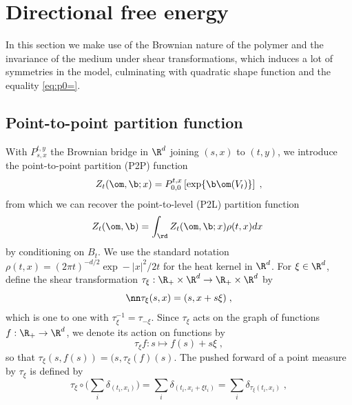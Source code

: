  \chapter{Directional free energy} \label{ch:dir}
 
 In this section we make use of the Brownian nature of the polymer and the invariance of the medium under shear transformations, which induces a lot of symmetries in the model, culminating with quadratic shape function and the equality
 \eqref{eq:p0=}. 
 
 \section{Point-to-point partition function}

With $P_{s,x}^{t,y}$  the Brownian bridge  in $\R^d$ joining $(s,x)$ to $(t,y)$, we introduce the point-to-point partition (P2P) function
\begin{equation} \label{PtoPdefinition}
Z_t(\om, \b; x) = P_{0,0}^{t,x}\left[ \exp \{ \b \om(V_t)\}\right]\;,
\end{equation}
from which we can recover the point-to-level (P2L) partition function
 \begin{equation}
\label{eq:intZ}
Z_t(\om,\b)= \int_{\rd} Z_t(\om, \b; x) \rho(t,x) dx \; 
\end{equation}
by conditioning on $B_t$.
We use the standard notation %
$%
\rho(t,x) = (2 \pi t)^{-d/2} \exp - |x|^2/2t
$ for the heat kernel in $\R^d$. %
For $\xi \in \R^d$, define the shear transformation $\tau_\xi: \R_+\times \R^d \to \R_+\times \R^d$ by
\begin{equation}\nn
\tau_\xi(s,x)=(s,x+s\xi)\;,
\end{equation}
which is one to one with $\tau_\xi^{-1}=\tau_{-\xi}$.
Since $\tau_\xi$ acts on the graph of functions $f: \R_+ \to \R^d$, we denote its action on functions
by
\begin{equation} \label{eq:tauxif}
\tau_\xi f : s \mapsto f(s)+s\xi \;,
\end{equation}
so that $\tau_\xi(s,f(s))=(s, \tau_\xi(f)(s)$.
The pushed forward of  a point measure by $\tau_\xi$  is defined by
\begin{equation}\label{eq:tau}
\tau_\xi \circ \big(\sum_i \delta_{(t_i, x_i)}\big) = \sum_i \delta_{(t_i, x_i + \xi t_i)}=  \sum_i \delta_{\tau_\xi (t_i, x_i)}
 \;,
\end{equation}
